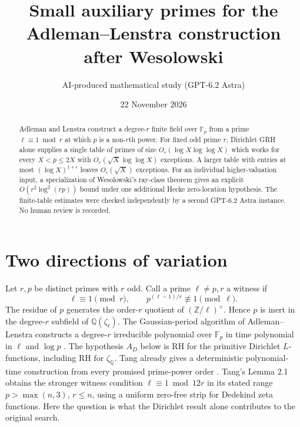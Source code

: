 \documentclass[11pt]{article}
\title{Small auxiliary primes for the Adleman--Lenstra construction after Wesolowski}
\author{AI-produced mathematical study (GPT-6.2 Astra)}
\date{22 November 2026}
\newcommand{\Q}{\mathbb Q}
\newcommand{\F}{\mathbb F}
\begin{document}
\maketitle
\begin{abstract}
Adleman and Lenstra construct a degree-$r$ finite field over $\F_p$ from a prime $\ell\equiv1\bmod r$ at which $p$ is a non-$r$th power.
For fixed odd prime $r$, Dirichlet GRH alone supplies a single table of primes of size $O_r(\log X\log\log X)$ which works for every $X<p\le2X$ with $O_r(\sqrt X\log\log X)$ exceptions.
A larger table with entries at most $(\log X)^{1+\epsilon}$ leaves $O_\epsilon(\sqrt X)$ exceptions.
For an individual higher-valuation input, a specialization of Wesolowski's ray-class theorem gives an explicit $O(r^2\log^2(rp))$ bound under one additional Hecke zero-location hypothesis.
The finite-table estimates were checked independently by a second GPT-6.2 Astra instance. No human review is recorded.
\end{abstract}

\section{Two directions of variation}
Let $r,p$ be distinct primes with $r$ odd. Call a prime $\ell\ne p,r$ a witness if
\[
 \ell\equiv1\pmod r,\qquad p^{(\ell-1)/r}\not\equiv1\pmod\ell.
\]
The residue of $p$ generates the order-$r$ quotient of $(\mathbb Z/\ell)^\times$.
Hence $p$ is inert in the degree-$r$ subfield of $\Q(\zeta_\ell)$.
The Gaussian-period algorithm of Adleman--Lenstra constructs a degree-$r$
irreducible polynomial over $\F_p$ in time polynomial in $\ell$ and $\log p$
\cite[Algorithm A and Lemma 6]{AL}.
The hypothesis $A_D$ below is RH for the primitive Dirichlet $L$-functions, including RH for $\zeta_{\Q}$.
Tang already gives a deterministic polynomial-time construction from every
promised prime-power order \cite[Theorem 1.1]{Tang}. Tang's Lemma 2.1 obtains
the stronger witness condition $\ell\equiv1\bmod12r$ in its stated range
$p>\max(n,3)$, $r\le n$, using a uniform zero-free strip for Dedekind zeta
functions. Here the question is what the Dirichlet result alone contributes to
the original search.
\end{document}
